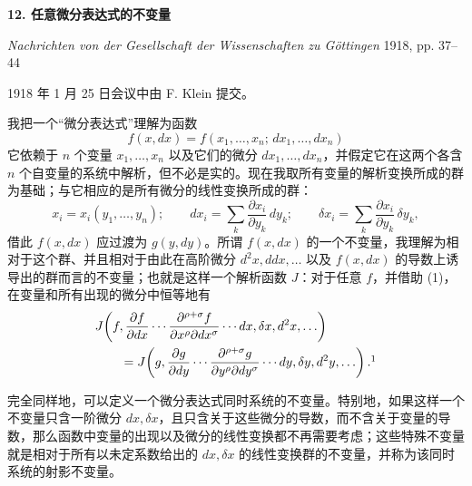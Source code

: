 \providecommand{\bdelta}{\bar{\delta}}
\begin{center}
{\Large\bfseries 12. 任意微分表达式的不变量}\par
\vspace{1.5em}
\emph{Nachrichten von der Gesellschaft der Wissenschaften zu Göttingen} 1918, pp. 37--44
\end{center}

\vspace{3em}
\begin{center}
1918 年 1 月 25 日会议中由 F. Klein 提交。
\end{center}

我把一个“微分表达式”理解为函数
\[
f(x,dx)=f(x_1,\ldots,x_n;\,dx_1,\ldots,dx_n)
\]
它依赖于 \(n\) 个变量 \(x_1,\ldots,x_n\) 以及它们的微分
\(dx_1,\ldots,dx_n\)，并假定它在这两个各含 \(n\) 个自变量的系统中解析，但不必是实的。现在我取所有变量的解析变换所成的群为基础；与它相应的是所有微分的线性变换所成的群：
\begin{equation}
x_i=x_i(y_1,\ldots,y_n);\qquad
dx_i=\sum_k\frac{\partial x_i}{\partial y_k}\,dy_k;\qquad
\delta x_i=\sum_k\frac{\partial x_i}{\partial y_k}\,\delta y_k,
\tag{1}
\end{equation}
借此 \(f(x,dx)\) 应过渡为 \(g(y,dy)\)。所谓 \(f(x,dx)\) 的一个不变量，我理解为相对于这个群、并且相对于由此在高阶微分 \(d^2x,ddx,\ldots\) 以及 \(f(x,dx)\) 的导数上诱导出的群而言的不变量；也就是这样一个解析函数 \(J\)：对于任意 \(f\)，并借助 (1)，在变量和所有出现的微分中恒等地有
\[
\begin{aligned}
&J\!\left(f,\frac{\partial f}{\partial dx}\cdots
\frac{\partial^{\rho+\sigma}f}{\partial x^\rho\partial dx^\sigma}
\cdots dx,\delta x,d^2x,\ldots\right)\\
&\qquad =
J\!\left(g,\frac{\partial g}{\partial dy}\cdots
\frac{\partial^{\rho+\sigma}g}{\partial y^\rho\partial dy^\sigma}
\cdots dy,\delta y,d^2y,\ldots\right).\footnotemark
\end{aligned}
\]

完全同样地，可以定义一个微分表达式同时系统的不变量。特别地，如果这样一个不变量只含一阶微分 \(dx,\delta x\)，且只含关于这些微分的导数，而不含关于变量的导数，那么函数中变量的出现以及微分的线性变换都不再需要考虑；这些特殊不变量就是相对于所有以未定系数给出的 \(dx,\delta x\) 的线性变换群的不变量，并称为该同时系统的射影不变量。

